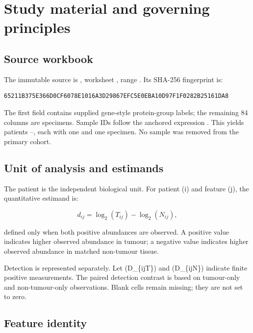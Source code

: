 \chapter{Study material and governing principles}
\label{chap:study_material_and_governing_principles}

\section{Source workbook}
\label{sec:source_workbook}

The immutable source is , worksheet \texttt{}, range \texttt{}. Its SHA-256 fingerprint is:

\begin{verbatim}
65211B375E366D0CF6078E1016A3D29867EFC5E0EBA10D97F1F0282B25161DA8
\end{verbatim}

The first field contains supplied gene-style protein-group labels; the remaining 84 columns are specimens. Sample IDs follow the anchored expression \texttt{}. This yields patients \texttt{}–\texttt{}, each with one \texttt{} and one \texttt{} specimen. No sample was removed from the primary cohort.

\section{Unit of analysis and estimands}
\label{sec:unit_of_analysis_and_estimands}

The patient is the independent biological unit. For patient (i) and feature (j), the quantitative estimand is:

\[
d_{ij}=\log_2(T_{ij})-\log_2(N_{ij}),
\]

defined only when both positive abundances are observed. A positive value indicates higher observed abundance in tumour; a negative value indicates higher observed abundance in matched non-tumour tissue.

Detection is represented separately. Let (D\_\{ijT\}) and (D\_\{ijN\}) indicate finite positive measurements. The paired detection contrast is based on tumour-only and non-tumour-only observations. Blank cells remain missing; they are not set to zero.

\section{Feature identity}
\label{sec:feature_identity}

